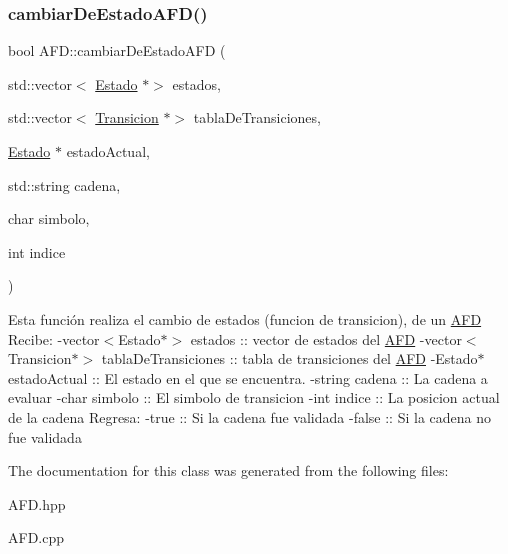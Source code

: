 \subsubsection{\texorpdfstring{cambiar\+De\+Estado\+A\+F\+D()}{cambiarDeEstadoAFD()}}
{\footnotesize\ttfamily bool A\+F\+D\+::cambiar\+De\+Estado\+A\+FD (\begin{DoxyParamCaption}\item[{std\+::vector$<$ \hyperlink{class_estado}{Estado} $\ast$$>$}]{estados,  }\item[{std\+::vector$<$ \hyperlink{class_transicion}{Transicion} $\ast$$>$}]{tabla\+De\+Transiciones,  }\item[{\hyperlink{class_estado}{Estado} $\ast$}]{estado\+Actual,  }\item[{std\+::string}]{cadena,  }\item[{char}]{simbolo,  }\item[{int}]{indice }\end{DoxyParamCaption})}

Esta función realiza el cambio de estados (funcion de transicion), de un \hyperlink{class_a_f_d}{A\+FD} Recibe\+: -\/vector$<$Estado$\ast$$>$ estados \+:\+: vector de estados del \hyperlink{class_a_f_d}{A\+FD} -\/vector$<$Transicion$\ast$$>$ tabla\+De\+Transiciones \+:\+: tabla de transiciones del \hyperlink{class_a_f_d}{A\+FD} -\/\+Estado$\ast$ estado\+Actual \+:\+: El estado en el que se encuentra. -\/string cadena \+:\+: La cadena a evaluar -\/char simbolo \+:\+: El simbolo de transicion -\/int indice \+:\+: La posicion actual de la cadena Regresa\+: -\/true \+:\+: Si la cadena fue validada -\/false \+:\+: Si la cadena no fue validada 

The documentation for this class was generated from the following files\+:\begin{DoxyCompactItemize}
\item 
A\+F\+D.\+hpp\item 
A\+F\+D.\+cpp\end{DoxyCompactItemize}
